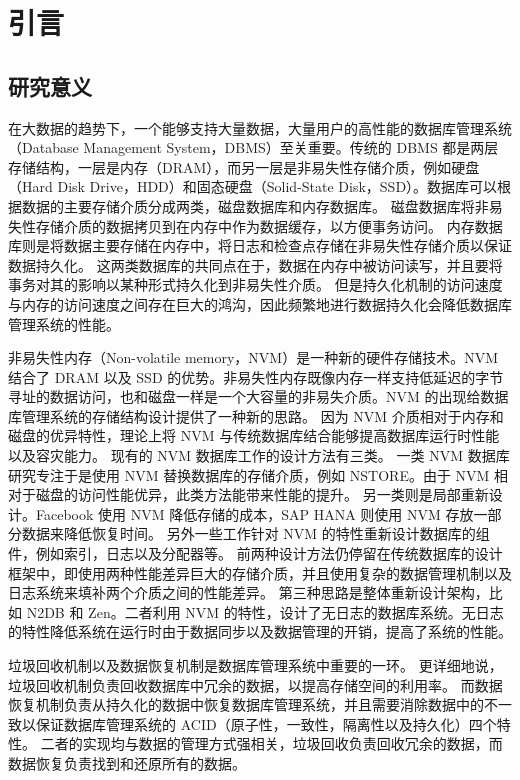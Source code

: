 
\chapter{引言}

\section{研究意义}

在大数据的趋势下，一个能够支持大量数据，大量用户的高性能的数据库管理系统（Database Management System，DBMS）至关重要。传统的 DBMS 都是两层存储结构，一层是内存（DRAM），而另一层是非易失性存储介质，例如硬盘（Hard Disk Drive，HDD）和固态硬盘（Solid-State Disk，SSD）。数据库可以根据数据的主要存储介质分成两类，磁盘数据库和内存数据库。
磁盘数据库将非易失性存储介质的数据拷贝到在内存中作为数据缓存，以方便事务访问。
内存数据库则是将数据主要存储在内存中，将日志和检查点存储在非易失性存储介质以保证数据持久化。
这两类数据库的共同点在于，数据在内存中被访问读写，并且要将事务对其的影响以某种形式持久化到非易失性介质。
但是持久化机制的访问速度与内存的访问速度之间存在巨大的鸿沟，因此频繁地进行数据持久化会降低数据库管理系统的性能。

非易失性内存（Non-volatile memory，NVM）是一种新的硬件存储技术。NVM 结合了 DRAM 以及 SSD 的优势。非易失性内存既像内存一样支持低延迟的字节寻址的数据访问，也和磁盘一样是一个大容量的非易失介质。NVM 的出现给数据库管理系统的存储结构设计提供了一种新的思路。
因为 NVM 介质相对于内存和磁盘的优异特性，理论上将 NVM 与传统数据库结合能够提高数据库运行时性能以及容灾能力。
现有的 NVM 数据库工作的设计方法有三类。
一类 NVM 数据库研究专注于是使用 NVM 替换数据库的存储介质，例如 NSTORE\cite{arulraj_lets_2015}。由于 NVM 相对于磁盘的访问性能优异，此类方法能带来性能的提升。
另一类则是局部重新设计。Facebook 使用 NVM 降低存储的成本\cite{facebook}，SAP HANA 则使用 NVM 存放一部分数据来降低恢复时间\cite{andrei_sap_2017}。
另外一些工作针对 NVM 的特性重新设计数据库的组件，例如索引\cite{nv-tree,chen_persistent_2015,ma_roart_2021,arulraj2018bztree}，日志\cite{wbl}以及分配器\cite{pmdk,bhandari_makalu_2016}等。
前两种设计方法仍停留在传统数据库的设计框架中，即使用两种性能差异巨大的存储介质，并且使用复杂的数据管理机制以及日志系统来填补两个介质之间的性能差异。
第三种思路是整体重新设计架构，比如 N2DB\cite{liu_graduate} 和 Zen\cite{liu_zen_2021}。二者利用 NVM 的特性，设计了无日志的数据库系统。无日志的特性降低系统在运行时由于数据同步以及数据管理的开销，提高了系统的性能。


垃圾回收机制以及数据恢复机制是数据库管理系统中重要的一环。
更详细地说，垃圾回收机制负责回收数据库中冗余的数据，以提高存储空间的利用率。
而数据恢复机制负责从持久化的数据中恢复数据库管理系统，并且需要消除数据中的不一致以保证数据库管理系统的 ACID（原子性，一致性，隔离性以及持久化）四个特性。
二者的实现均与数据的管理方式强相关，垃圾回收负责回收冗余的数据，而数据恢复负责找到和还原所有的数据。

